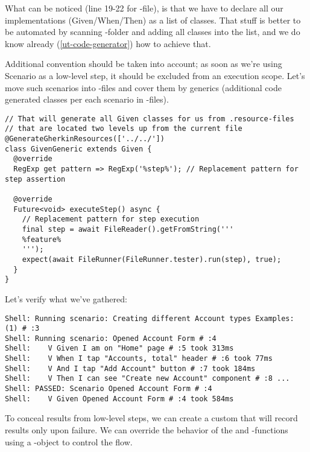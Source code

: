 \noindent What can be noticed (line 19-22 for -file), is that we have to declare all 
our implementations (Given/When/Then) as a list of classes. That stuff is better to be automated by scanning 
-folder and adding all classes into the list, and we do know already (\ref{ut-code-generator}) how to 
achieve that.

Additional convention should be taken into account; as soon as we're using Scenario as a low-level step, it should be
excluded from an execution scope. Let's move such scenarios into -files and cover them by generics 
(additional code generated classes per each scenario in -files).

\begin{lstlisting}
// That will generate all Given classes for us from .resource-files
// that are located two levels up from the current file
@GenerateGherkinResources(['../../'])
class GivenGeneric extends Given {
  @override
  RegExp get pattern => RegExp('%step%'); // Replacement pattern for step assertion

  @override
  Future<void> executeStep() async {
    // Replacement pattern for step execution
    final step = await FileReader().getFromString('''
    %feature%
    ''');
    expect(await FileRunner(FileRunner.tester).run(step), true);
  }
}
\end{lstlisting}

\noindent Let's verify what we've gathered:

\begin{lstlisting}[language=terminal]
Shell: Running scenario: Creating different Account types Examples: (1) # :3
Shell: Running scenario: Opened Account Form # :4
Shell:    V Given I am on "Home" page # :5 took 313ms
Shell:    V When I tap "Accounts, total" header # :6 took 77ms
Shell:    V And I tap "Add Account" button # :7 took 184ms
Shell:    V Then I can see "Create new Account" component # :8 ...
Shell: PASSED: Scenario Opened Account Form # :4
Shell:    V Given Opened Account Form # :4 took 584ms
\end{lstlisting}

\noindent To conceal results from low-level steps, we can create a custom  that will record results 
only upon failure. We can override the behavior of the  and -functions using a 
-object to control the flow.

